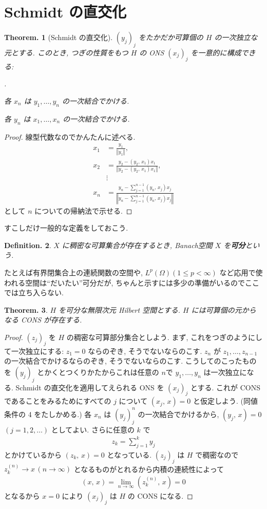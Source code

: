 \documentclass[openany, a4paper, oneside]{jsbook}
\newcounter{enum2}
\renewenvironment{enumerate}{%
\begin{list}%
{%
\arabic{enum2}.\ \,%
}%
{%
\usecounter{enum2}
\setlength{\itemindent}{0pt}%
\setlength{\leftmargin}{15pt}%
\setlength{\rightmargin}{0pt}%
\setlength{\labelsep}{0pt}%
\setlength{\labelwidth}{6pt}%
\setlength{\itemsep}{0pt}%
\setlength{\parsep}{0pt}%
\setlength{\listparindent}{0pt}%
}
}{%
\end{list}%
}
\theoremstyle{break}
\theoremstyle{breakdefn}
\newtheorem{thm}{Theorem.}[section]
\newtheorem{defn}[thm]{Definition.}
\newcommand{\norm}[1]{\left\Vert#1\right\Vert}
\newcommand{\rbkt}[2]{\left ( #1,\,#2 \right)}
\begin{document}
\section{Schmidt の直交化}


\begin{thm}[Schmidt の直交化]
 $(y_j)_j$ をたかだか可算個の $H$ の一次独立な元とする.
 このとき, つぎの性質をもつ $H$ の ONS $(x_j)_j$ を一意的に構成できる:
\begin{enumerate}
\item 各 $x_n$ は $y_1, \dots, y_n$ の一次結合でかける.
\item 各 $y_n$ は $x_1, \dots, x_n$ の一次結合でかける.
\end{enumerate}
\end{thm}
\begin{proof}
線型代数なのでかんたんに述べる.
\begin{align}
 x_1
 &=
 \frac{y_1}{\norm{y_1}}, \\
 x_2
 &=
 \frac{y_2 - \rbkt{y_2}{x_1}x_1}{\norm{y_2 - \rbkt{y_2}{x_1}x_1}}, \\
 &\vdots \\
 x_n
 &=
 \frac{y_n - \sum_{j=1}^{n-1} \rbkt{y_n}{x_j} x_j}{\norm{y_n - \sum_{j=1}^{n-1} \rbkt{y_n}{x_j} x_j}}
\end{align}
として $n$ についての帰納法で示せる.
\end{proof}

すこしだけ一般的な定義をしておこう.
\begin{defn}
$X$ に稠密な可算集合が存在するとき,
Banach空間 $X$ を\textbf{可分}という.
\end{defn}
たとえば有界閉集合上の連続関数の空間や,
$L^p(\Omega) (1 \le p < \infty)$
など応用で使われる空間は``だいたい''可分だが,
ちゃんと示すには多少の準備がいるのでここでは立ち入らない.

\begin{thm}
 $H$ を可分な無限次元 Hilbert 空間とする.
 $H$ には可算個の元からなる CONS が存在する.
\end{thm}
\begin{proof}
$(z_j)_j$ を $H$ の稠密な可算部分集合としよう.
まず, これをつぎのようにして一次独立にする:
$z_1 = 0$ ならのぞき, そうでないならのこす.
$z_n$ が $z_1, \dots, z_{n-1}$ の一次結合でかけるならのぞき,
そうでないならのこす.
こうしてのこったものを $(y_j)_j$ とかくとつくりかたからこれは任意の $n$で $y_1, \dots, y_n$ は一次独立になる.
Schmidt の直交化を適用してえられる ONS を $(x_j)_j$ とする.
これが CONS であることをみるためにすべての $j$ について $\rbkt{x_j}{x} = 0$ と仮定しよう.
(同値条件の 4 をたしかめる.)
各 $x_n$ は $(y_j)_j^n$ の一次結合でかけるから,
$\rbkt{y_j}{x} = 0$ $(j = 1, 2, \dots)$ としてよい.
さらに任意の $k$ で
\begin{align}
 z_k
 =
 \sum_{j=1}^k y_j
\end{align}
とかけているから $\rbkt{z_k}{x} = 0$ となっている.
$(z_j)_j$ は $H$ で稠密なので $z_k^{(n)} \to x \, (n \to \infty)$ となるものがとれるから内積の連続性によって
\begin{align}
 \rbkt{x}{x}
 =
 \lim_{n \to \infty} \rbkt{z_k^{(n)}}{x}
 =
 0
\end{align}
となるから $x=0$ により $(x_j)_j$ は $H$ の CONS になる.
\end{proof}
\end{document}
